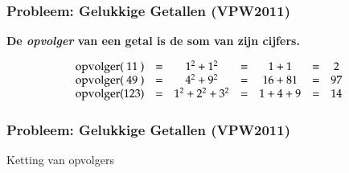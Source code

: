 \begin{frame}
  \frametitle{Probleem: Gelukkige Getallen (VPW2011)}
  \begin{center} \large\bfseries
    De \emph{opvolger} van een getal is de som van zijn cijfers.
  \end{center}
  \vskip4mm
  \[
    \begin{array}{r@{}c@{}lcccccc}
      \mathrm{opvolger}(&11&) & = & 1^2 + 1^2 & = & 1 + 1 & = & 2 \\
      \mathrm{opvolger}(&49&) & = & 4^2 + 9^2 & = & 16 + 81 & = & 97 \\
      \mathrm{opvolger}(&123&) & = & 1^2 + 2^2 + 3^2 & = & 1 + 4 + 9 & = & 14
    \end{array}
  \]
\end{frame}

\begin{frame}
  \frametitle{Probleem: Gelukkige Getallen (VPW2011)}
  \begin{center}
  \end{center}
  \vskip5mm
  \begin{center}
    \large Ketting van opvolgers
  \end{center}    
\end{frame}

